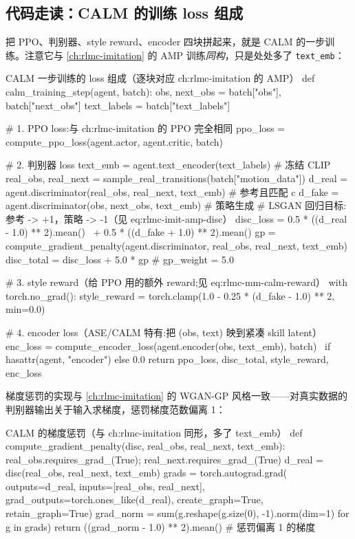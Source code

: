 \subsection{代码走读：CALM 的训练 loss 组成}
\label{sec:rlmc-mm-calm-loss}

把 PPO、判别器、style reward、encoder 四块拼起来，就是 CALM 的一步训练。注意它与 \cref{ch:rlmc-imitation} 的 AMP 训练\emph{同构}，只是处处多了 \verb|text_emb|：

\begin{codebox}[Python]{CALM 一步训练的 loss 组成（逐块对应 ch:rlmc-imitation 的 AMP）}
def calm_training_step(agent, batch):
    obs, next_obs = batch["obs"], batch["next_obs"]
    text_labels = batch["text_labels"]

    # 1. PPO loss:与 ch:rlmc-imitation 的 PPO 完全相同
    ppo_loss = compute_ppo_loss(agent.actor, agent.critic, batch)

    # 2. 判别器 loss
    text_emb = agent.text_encoder(text_labels)                       # 冻结 CLIP
    real_obs, real_next = sample_real_transitions(batch["motion_data"])
    d_real = agent.discriminator(real_obs, real_next, text_emb)      # 参考且匹配 c
    d_fake = agent.discriminator(obs, next_obs, text_emb)            # 策略生成
    # LSGAN 回归目标:参考 -> +1，策略 -> -1（见 eq:rlmc-imit-amp-disc）
    disc_loss = 0.5 * ((d_real - 1.0) ** 2).mean() \
              + 0.5 * ((d_fake + 1.0) ** 2).mean()
    gp = compute_gradient_penalty(agent.discriminator, real_obs, real_next, text_emb)
    disc_total = disc_loss + 5.0 * gp                                # gp_weight = 5.0

    # 3. style reward（给 PPO 用的额外 reward;见 eq:rlmc-mm-calm-reward）
    with torch.no_grad():
        style_reward = torch.clamp(1.0 - 0.25 * (d_fake - 1.0) ** 2, min=0.0)

    # 4. encoder loss（ASE/CALM 特有:把 (obs, text) 映到紧凑 skill latent）
    enc_loss = compute_encoder_loss(agent.encoder(obs, text_emb), batch) \
               if hasattr(agent, "encoder") else 0.0
    return ppo_loss, disc_total, style_reward, enc_loss
\end{codebox}

梯度惩罚的实现与 \cref{ch:rlmc-imitation} 的 WGAN-GP 风格一致——对真实数据的判别器输出关于输入求梯度，惩罚梯度范数偏离 1：

\begin{codebox}[Python]{CALM 的梯度惩罚（与 ch:rlmc-imitation 同形，多了 text\_emb）}
def compute_gradient_penalty(disc, real_obs, real_next, text_emb):
    real_obs.requires_grad_(True); real_next.requires_grad_(True)
    d_real = disc(real_obs, real_next, text_emb)
    grads = torch.autograd.grad(
        outputs=d_real, inputs=[real_obs, real_next],
        grad_outputs=torch.ones_like(d_real),
        create_graph=True, retain_graph=True)
    grad_norm = sum(g.reshape(g.size(0), -1).norm(dim=1) for g in grads)
    return ((grad_norm - 1.0) ** 2).mean()        # 惩罚偏离 1 的梯度
\end{codebox}

